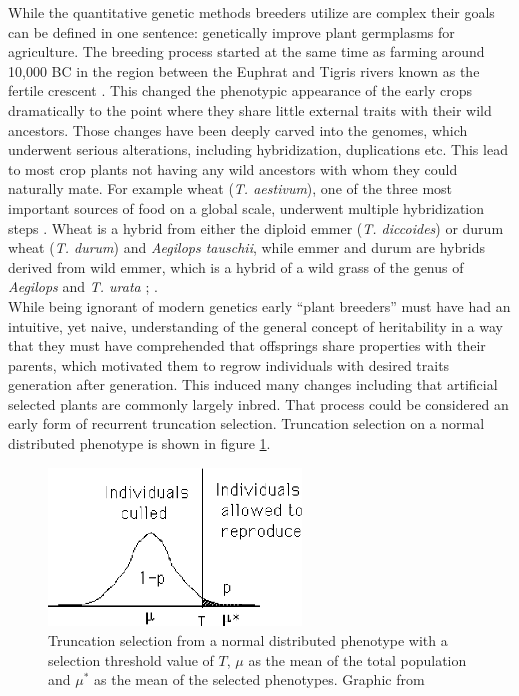 While the quantitative genetic methods breeders utilize are complex their goals can be
defined in one sentence: genetically improve plant germplasms for agriculture. The
breeding process started at the same time as farming around 10,000 BC in the region
between the Euphrat and Tigris rivers known as the fertile crescent
\cite{kingsbury2009hybrid}. This changed the phenotypic appearance of the early crops
dramatically to the point where they share little external traits with their wild
ancestors. Those changes have been deeply carved into the genomes, which underwent serious
alterations, including hybridization, duplications etc. This lead to most crop plants not
having any wild ancestors with whom they could naturally mate. For example wheat
(\textit{T. aestivum}), one of the three most important sources of food on a global
scale, underwent multiple hybridization steps \cite{ozkan2001allopolyploidy}. Wheat is a
hybrid from either the diploid emmer (\textit{T. diccoides}) or durum wheat
(\textit{T. durum}) and \textit{{Aegilops tauschii}}, while emmer and durum are hybrids
derived from wild emmer, which is a hybrid of a wild grass of the genus of \textit{Aegilops}
and \textit{T. urata} \cite{friebe2000development}; \cite{feldman2012genome}.\\
While being ignorant of modern genetics early ``plant breeders'' must have had an
intuitive, yet naive, understanding of the general concept of heritability in a way that
they must have comprehended that offsprings share properties with their parents, which
motivated them to regrow individuals with desired traits generation after
generation. This induced many changes including that artificial selected plants are
commonly largely inbred. That process could be considered an early form of recurrent
truncation selection. Truncation selection on a normal distributed phenotype is shown in
figure \ref{fig:trunSel}.
 
\begin{figure}[H]
  \centering \includegraphics[height=.25\textheight, width=0.6\textwidth]{Figures/truncSel} \decoRule
  \caption[Truncation selection of a normal distributed phenotype]{Truncation selection
    from a normal distributed phenotype with a selection threshold value of $T$, $\mu$ as
    the mean of the total population and $\mu^{\ast}$ as the mean of the selected
    phenotypes. Graphic from \cite{walsh2018short}}
 \label{fig:trunSel}
\end{figure}

